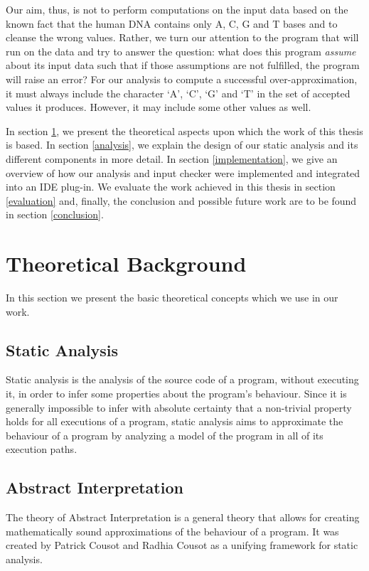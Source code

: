 \documentclass[10pt]{report}
\begin{document}
Our aim, thus, is not to perform computations on the input data based on the known fact that the human DNA contains only A, C, G and T bases and to cleanse the wrong values. Rather, we turn our attention to the program that will run on the data and try to answer the question: what does this program \textit{assume} about its input data such that if those assumptions are not fulfilled, the program will raise an error? For our analysis to compute a successful over-approximation, it must always include the character `A', `C', `G' and `T' in the set of accepted values it produces. However, it may include some other values as well. 

In section \ref{theoretical}, we present the theoretical aspects upon which the work of this thesis is based. In section \ref{analysis}, we explain the design of our static analysis and its different components in more detail. In section \ref{implementation}, we give an overview of how our analysis and input checker were implemented and integrated into an IDE plug-in. We evaluate the work achieved in this thesis in section \ref{evaluation} and, finally, the conclusion and possible future work are to be found in section \ref{conclusion}. 

\section{Theoretical Background} \label{theoretical}

In this section we present the basic theoretical concepts which we use in our work. 

\subsection{Static Analysis}
Static analysis is the analysis of the source code of a program, without executing it, in order to infer some properties about the program's behaviour. Since it is generally impossible to infer with absolute certainty that a non-trivial property holds for all executions of a program, static analysis aims to approximate the behaviour of a program by analyzing a model of the program in all of its execution paths. 

\subsection{Abstract Interpretation}
The theory of Abstract Interpretation \cite{cousot} is a general theory that allows for creating mathematically sound approximations of the behaviour of a program. It was created by Patrick Cousot and Radhia Cousot as a unifying framework for static analysis. 
\end{document}
